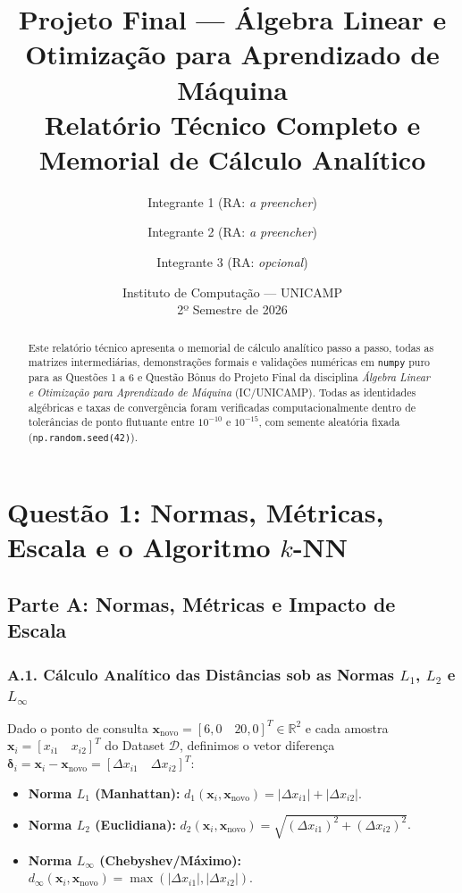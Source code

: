 \documentclass[11pt,a4paper]{article}
\title{\textbf{Projeto Final — Álgebra Linear e Otimização para Aprendizado de Máquina}\\
\large Relatório Técnico Completo e Memorial de Cálculo Analítico}
\author{
Integrante 1 (RA: \textit{a preencher}) \and
Integrante 2 (RA: \textit{a preencher}) \and
Integrante 3 (RA: \textit{opcional})
}
\date{Instituto de Computação — UNICAMP \\ 2º Semestre de 2026}
\begin{document}
\maketitle

\begin{abstract}
Este relatório técnico apresenta o memorial de cálculo analítico passo a passo, todas as matrizes intermediárias, demonstrações formais e validações numéricas em \texttt{numpy} puro para as Questões 1 a 6 e Questão Bônus do Projeto Final da disciplina \textit{Álgebra Linear e Otimização para Aprendizado de Máquina} (IC/UNICAMP). Todas as identidades algébricas e taxas de convergência foram verificadas computacionalmente dentro de tolerâncias de ponto flutuante entre $10^{-10}$ e $10^{-15}$, com semente aleatória fixada (\texttt{np.random.seed(42)}).
\end{abstract}

\tableofcontents
\newpage

\section{Questão 1: Normas, Métricas, Escala e o Algoritmo $k$-NN}

\subsection{Parte A: Normas, Métricas e Impacto de Escala}

\subsubsection*{A.1. Cálculo Analítico das Distâncias sob as Normas $L_1$, $L_2$ e $L_\infty$}
Dado o ponto de consulta $\mathbf{x}_{\text{novo}} = [6{,}0 \quad 20{,}0]^T \in \mathbb{R}^2$ e cada amostra $\mathbf{x}_i = [x_{i1} \quad x_{i2}]^T$ do Dataset $\mathcal{D}$, definimos o vetor diferença $\boldsymbol{\delta}_i = \mathbf{x}_i - \mathbf{x}_{\text{novo}} = [\Delta x_{i1} \quad \Delta x_{i2}]^T$:
\begin{itemize}
    \item \textbf{Norma $L_1$ (Manhattan):} $d_1(\mathbf{x}_i, \mathbf{x}_{\text{novo}}) = |\Delta x_{i1}| + |\Delta x_{i2}|$.
    \item \textbf{Norma $L_2$ (Euclidiana):} $d_2(\mathbf{x}_i, \mathbf{x}_{\text{novo}}) = \sqrt{(\Delta x_{i1})^2 + (\Delta x_{i2})^2}$.
    \item \textbf{Norma $L_\infty$ (Chebyshev/Máximo):} $d_\infty(\mathbf{x}_i, \mathbf{x}_{\text{novo}}) = \max(|\Delta x_{i1}|, |\Delta x_{i2}|)$.
\end{itemize}
\end{document}
